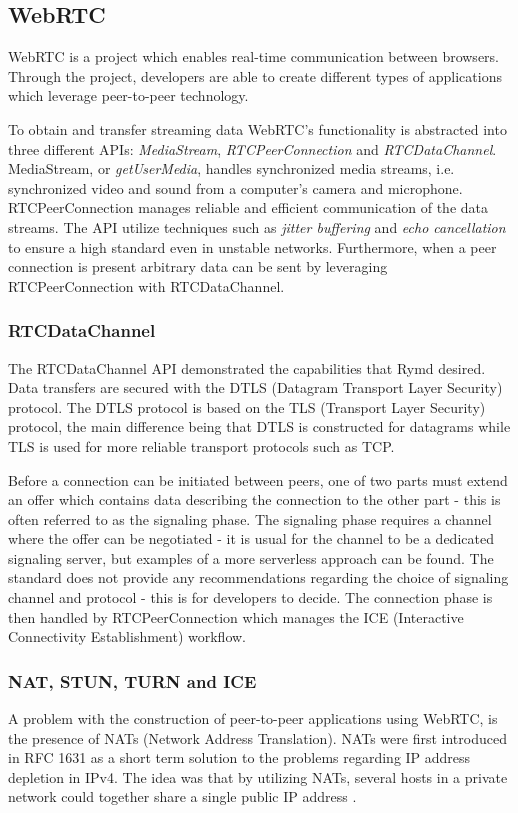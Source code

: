 \subsection{WebRTC}
WebRTC is a project which enables real-time communication between browsers\cite{WebRTC:Online}. Through the project, developers are able to create different types of applications which leverage peer-to-peer technology.

To obtain and transfer streaming data WebRTC's functionality is abstracted into three different APIs: \emph{MediaStream}, \emph{RTCPeerConnection} and \emph{RTCDataChannel}\cite{WebRTCBasics:2012:Online}. MediaStream, or \emph{getUserMedia}, handles synchronized media streams, i.e. synchronized video and sound from a computer's camera and microphone. RTCPeerConnection manages reliable and efficient communication of the data streams. The API utilize techniques such as \emph{jitter buffering} and \emph{echo cancellation} to ensure a high standard even in unstable networks. Furthermore, when a peer connection is present arbitrary data can be sent by leveraging RTCPeerConnection with RTCDataChannel.

\subsubsection{RTCDataChannel}
The RTCDataChannel API demonstrated the capabilities that Rymd desired. Data transfers are secured with the DTLS (Datagram Transport Layer Security) protocol. The DTLS protocol is based on the TLS (Transport Layer Security) protocol, the main difference being that DTLS is constructed for datagrams while TLS is used for more reliable transport protocols such as TCP.

Before a connection can be initiated between peers, one of two parts must extend an offer which contains data describing the connection to the other part - this is often referred to as the signaling phase. The signaling phase requires a channel where the offer can be negotiated - it is usual for the channel to be a dedicated signaling server, but examples of a more serverless approach can be found\cite{webrtcsignalserver}. The standard does not provide any recommendations regarding the choice of signaling channel and protocol - this is for developers to decide. The connection phase is then handled by RTCPeerConnection which manages the ICE (Interactive Connectivity Establishment) workflow.

\subsubsection{NAT, STUN, TURN and ICE}
A problem with the construction of peer-to-peer applications using WebRTC, is the presence of NATs (Network Address Translation). NATs were first introduced in RFC 1631 as a short term solution to the problems regarding IP address depletion in IPv4. The idea was that by utilizing NATs, several hosts in a private network could together share a single public IP address \cite{RFC1631:Online}.

